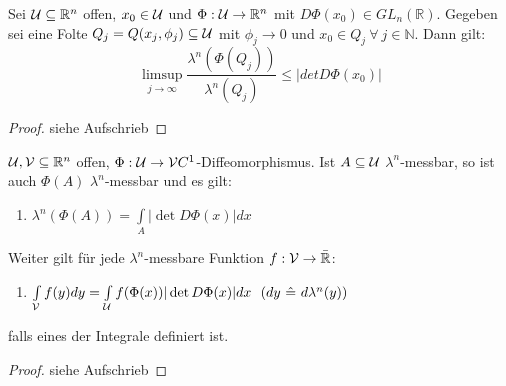   \begin{lemma}
    Sei $\mathcal{U} \subseteq \mathbb{R}^n$ offen, $x_0 \in \mathcal{U}$ und $\Phi: \mathcal{U} \to \mathbb{R}^n$ mit $D\Phi(x_0) \in GL_n(\mathbb{R})$. Gegeben sei eine Folte $Q_j = Q(x_j, \phi_j)\subseteq \mathcal{U}$ mit $\phi_j \to 0$ und $x_0 \in Q_j \ \forall \ j \in \mathbb{N}$. Dann gilt:
    $$\limsup\limits_{j \to \infty} \frac{\lambda^n(\Phi(Q_j))}{\lambda^n(Q_j)} \leq |det D\Phi(x_0)|$$
  \end{lemma}
  \begin{proof}
    siehe Aufschrieb
  \end{proof}

  \begin{theorem}[Transformationsformel]
    $\mathcal{U}, \mathcal{V} \subseteq\mathbb{R}^n$ offen, $\Phi:\mathcal{U} \to \mathcal{V} C^1$-Diffeomorphismus. Ist $A \subseteq \mathcal{U}$ $\lambda^n$-messbar, so ist auch $\Phi(A)$ $\lambda^n$-messbar und es gilt:
    \begin{enumerate}
      \item $\lambda^n(\Phi(A)) = \int\limits_A | \det D\Phi(x) | dx$
    \end{enumerate}
    Weiter gilt für jede $\lambda^n$-messbare Funktion $f: \mathcal{V} \to \bar{\mathbb{R}}$:
    \begin{enumerate}[resume]
      \item $\int\limits_{\mathcal{V}} f(y) dy = \int\limits_{\mathcal{U}} f(\Phi(x)) |\det D\Phi(x)| dx \ \ (dy \ \hat{=} \ d\lambda^n(y))$
    \end{enumerate}
    falls eines der Integrale definiert ist.
  \end{theorem}

  \begin{proof}
    siehe Aufschrieb
  \end{proof}

